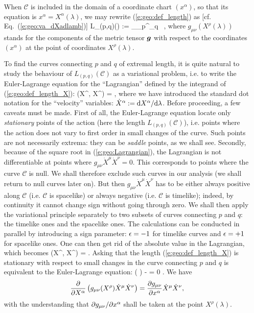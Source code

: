 When $\mathcal{C}$ is included in the domain of a coordinate chart
$(x^\alpha)$, so that its equation is $x^\alpha = X^\alpha(\lambda)$, we
may rewrite (\ref{e:geo:def_length}) as [cf. Eq.~(\ref{e:geo:va_dXadlamb})]
\be \label{e:geo:def_length_X}
    L_{(p,q)}()  := \int_{\lambda_p}^{\lambda_q}  \, \D\lambda ,
\ee
where $g_{\mu\nu}(X^\rho(\lambda))$ stands for the components of the
metric tensor $\bm{g}$ with respect to the coordinates $(x^\alpha)$ at the
point of coordinates $X^\rho(\lambda)$.

To find the curves connecting $p$ and $q$ of extremal length, it is
quite natural to study the behaviour of $L_{(p,q)}(\mathcal{C})$ as a
variational problem, i.e. to write the Euler-Lagrange equation
for the ``Lagrangian'' defined by the integrand of (\ref{e:geo:def_length_X}):
\be \label{e:geo:Lagrangian}
    (X^\alpha, {\dot X}^\alpha) = ,
\ee
where we have introduced the standard dot notation for the ``velocity'' variables:
${\dot X}^\alpha := \mathrm{d} X^\alpha / \mathrm{d}\lambda$. Before proceeding, a few
caveats must be made. First of all, the Euler-Lagrange equation
locate only \emph{stationary} points of the action (here the length
$L_{(p,q)}(\mathcal{C})$), i.e. points where the action does not vary
to first order in small changes of the curve. Such points are not
necessarily extrema: they can be \emph{saddle} points, as we shall see.
Secondly, because of the square root in (\ref{e:geo:Lagrangian}),
the Lagrangian is not differentiable at points where
$g_{\mu\nu} {\dot X}^\mu {\dot X}^\nu = 0$.
This corresponds to points where the curve $\mathcal{C}$ is null. We shall
therefore exclude such curves in our analysis (we shall return to null
curves later on). But then $g_{\mu\nu} {\dot X}^\mu {\dot X}^\nu$
has to be either always positive along $\mathcal{C}$ (i.e. $\mathcal{C}$
is spacelike) or always negative (i.e. $\mathcal{C}$ is timelike); indeed,
by continuity it cannot change sign without going through zero.
We shall then apply the variational principle separately
to two subsets of curves connecting $p$ and $q$: the timelike ones and the
spacelike ones. The calculations can be conducted in parallel by introducing
a sign parameter: $\epsilon=-1$ for timelike curves and $\epsilon=+1$ for spacelike
ones. One can then get rid of the absolute value in the Lagrangian, which
becomes
\be
    (X^\alpha, {\dot X}^\alpha) =  .
\ee
Asking that the length (\ref{e:geo:def_length_X}) is stationary
with respect to small changes in the curve connecting $p$ and $q$
is equivalent to the Euler-Lagrange equation:
\be
    \frac{\D}{\D\lambda}\left( \right)
        -  = 0 .
\ee
We have
\[
    \frac{\partial }{\partial X^\alpha} \left( g_{\mu\nu}(X^\rho) {\dot X}^\mu {\dot X}^\nu \right)
        = \frac{\partial g_{\mu\nu}}{\partial x^\alpha}  {\dot X}^\mu {\dot X}^\nu  ,
\]
with the understanding that ${\partial g_{\mu\nu}}/{\partial x^\alpha}$ shall be
taken at the point $X^\rho(\lambda)$.




